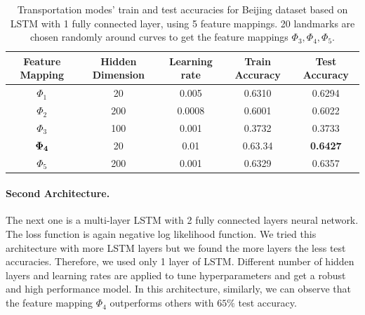 \documentclass[11pt]{myclass}
\begin{document}
\begin{table}[htbp]
\centering
\begin{tabular}{|c|c|c|c|c|}
\hline
       {\bf Feature Mapping} &  {\bf Hidden Dimension} &  {\bf Learning rate}  &   {\bf Train Accuracy} &  {\bf Test Accuracy}   \\
\hline 

$\Phi_1$	& 20  &  0.005 &   0.6310 &    0.6294  \\ 
\hline 
$\Phi_2$	& 200  &   0.0008 &   0.6001 &    0.6022  \\ 
\hline 
$\Phi_3$	& 100 &   0.001 &   0.3732 &    0.3733  \\ 
\hline 
{$\bf \Phi_4$}	& 20  &   0.01 &   0.63.34 &   {\bf 0.6427}  \\ 
\hline 
$\Phi_5$	& 200 &   0.001 &   0.6329 &    0.6357  \\ 
\hline 
\end{tabular}
\caption{Transportation modes' train and test accuracies for Beijing dataset based on LSTM with 1 fully connected layer, using 5 feature mappings. 20 landmarks are chosen randomly around curves to get the feature mappings $\Phi_3, \Phi_4, \Phi_5$.}
\label{table-LSTM1}
\normalsize
\end{table}

\paragraph{Second Architecture.} 
The next one is a multi-layer LSTM with 2 fully connected layers neural network. The loss function is again negative log likelihood function. We tried this architecture with more LSTM layers but we found the more layers the less test accuracies. Therefore, we used only 1 layer of LSTM. Different number of hidden layers and learning rates are applied to tune hyperparameters and get a robust and high performance model. In this architecture, similarly, we can observe that the feature mapping $\Phi_4$ outperforms others with $65\%$ test accuracy.
\end{document}
